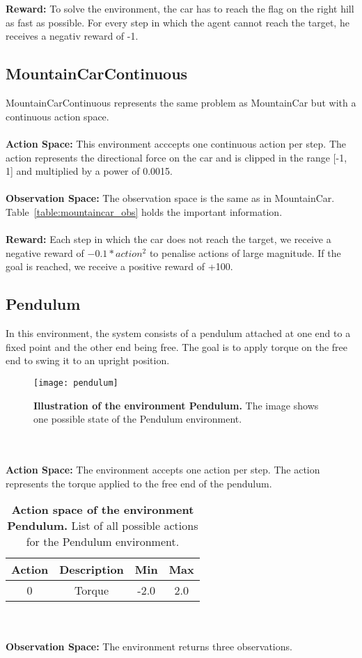 \\ \\
\textbf{Reward:} To solve the environment, the car has to reach the flag on the right hill as fast as possible. For every step in which the agent cannot reach the target, he receives a negativ reward of -1.

\subsection{MountainCarContinuous}
MountainCarContinuous represents the same problem as MountainCar but with a continuous action space.
\\ \\
\textbf{Action Space:} This environment acccepts one continuous action per step. The action represents the directional force on the car and is clipped in the range [-1, 1] and multiplied by a power of 0.0015.
\\ \\
\textbf{Observation Space:} The observation space is the same as in MountainCar. Table~\ref{table:mountaincar_obs} holds the important information.
\\ \\
\textbf{Reward:} Each step in which the car does not reach the target, we receive a negative reward of $-0.1 * action^2$ to penalise actions of large magnitude. If the goal is reached, we receive a positive reward of +100.

\subsection{Pendulum}
In this environment, the system consists of a pendulum attached at one end to a fixed point and the other end being free. The goal is to apply torque on the free end to swing it to an upright position.
\begin{figure}[!ht]
  \centering
\texttt{[image: pendulum]}
\caption[Illustration of the environment Pendulum]{
  \textbf{Illustration of the environment Pendulum.}
  The image shows one possible state of the Pendulum environment.
}
\label{fig:pendulum}
\end{figure}
\\ \\
\textbf{Action Space:} The environment accepts one action per step. The action represents the torque applied to the free end of the pendulum.
\begin{table}[!ht]
  \centering
  \begin{tabular}{ |c|c|c|c| }
    \hline
    Action & Description & Min & Max \\
    \hline
    0 & Torque & -2.0 & 2.0 \\
    \hline
  \end{tabular}
  \caption[Action space of the environment Pendulum]{
    \textbf{Action space of the environment Pendulum.}
    List of all possible actions for the Pendulum environment.
  }
  \label{table:pendulum_act}
\end{table}
\\ \\
\textbf{Observation Space:} The environment returns three observations.

